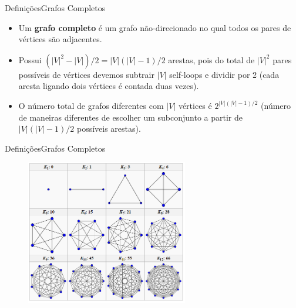 \documentclass[aspectratio=169]{beamer}
\begin{document}

\begin{frame}{Definições}{Grafos Completos}
\begin{itemize}
\item Um {\bf grafo completo} é um grafo não-direcionado no qual todos os pares de vértices são adjacentes.
\item Possui $(|V|^2 - |V|)/2 = |V|(|V| - 1)/2$ arestas, pois do total de $|V|^2$ pares possíveis de vértices devemos subtrair $|V|$ self-loops e dividir por 2 (cada aresta ligando dois vértices é contada duas vezes).
\item O número total de grafos diferentes com $|V|$ vértices é $2^{|V|(|V|-1)/2}$ (número de maneiras diferentes de escolher um subconjunto a partir de $|V|(|V| - 1)/2$ possíveis arestas).
\end{itemize}
\end{frame}


\begin{frame}{Definições}{Grafos Completos}
\begin{figure}[!h]
  \centering
  \includegraphics[width=200pt]{imagens/grafo_completo.png}
  \label{fig_exemplo_grafo_completo}
\end{figure}
\end{frame}

\end{document}
